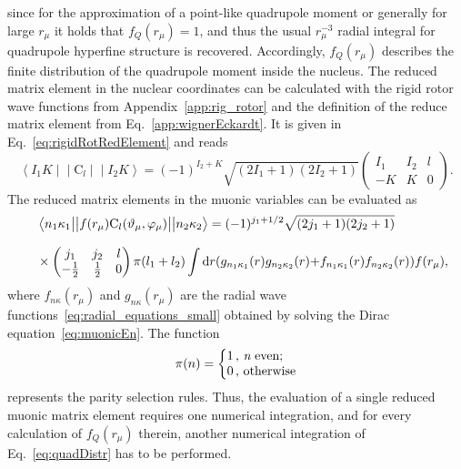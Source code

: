 since for the approximation of a point-like quadrupole moment or generally for large $r_\mu$ it holds that $f_Q(r_\mu)=1$, and thus the usual $r_\mu^{-3}$ radial integral for quadrupole hyperfine structure is recovered. Accordingly, $f_Q(r_\mu)$ describes the finite distribution of the quadrupole moment inside the nucleus. The reduced matrix element in the nuclear coordinates can be calculated with the rigid rotor wave functions from Appendix~\ref{app:rig_rotor} and the definition of the reduce matrix element from Eq.~\eqref{app:wignerEckardt}. It is given in Eq.~\eqref{eq:rigidRotRedElement} and reads
\begin{equation}
\left< I_1K\middle|\middle|\text{C}_l\middle|\middle|I_2K\right>=(-1)^{I_2+K}
\sqrt{(2I_1+1)(2I_2+1)}
\left(
\begin{matrix}
I_1&I_2&l\\
-K&K&0
\end{matrix}
\right).
\end{equation}
The reduced matrix elements in the muonic variables can be evaluated as~\cite{johnson2007}
\begin{alignat}{2}
&&&\left< n_1\kappa_1\big{|}\big{|}f(r_\mu)\text{C}_l(\vartheta_\mu,\varphi_\mu) \big{|}\big{|}n_2\kappa_2\right> =
 (-1)^{j_1+1/2} \sqrt{(2j_1+1)(2j_2+1)}
\notag\\[7.5pt]
&&&\times
\left(
\begin{matrix}
j_1&j_2&l\\
-\frac{1}{2}&\frac{1}{2}&0
\end{matrix}
\right)\pi(l_1+l_2)\int \text{d}r ({g_{n_1\kappa_1}(r)g_{n_2\kappa_2}(r)}{+}{f_{n_1\kappa_1}(r)f_{n_2\kappa_2}(r)}) f(r_\mu),
\end{alignat}
where $f_{n\kappa}(r_\mu)$ and $g_{n\kappa}(r_\mu)$ are the radial wave functions~\eqref{eq:radial_equations_small} obtained by solving the Dirac equation~\eqref{eq:muonicEn}.
The function
\begin{equation}
\label{eq:parityFunc}
\pi(n) =
\left\{
\begin{matrix}
1\,\text{, {\it n} even;}\phantom{11}\\
0\,\text{, otherwise}
\end{matrix}
\right.
\end{equation}
represents the parity selection rules.
Thus, the evaluation of a single reduced muonic matrix element requires one numerical integration, and for every calculation of $f_Q(r_\mu)$ therein, another numerical integration of Eq.~\eqref{eq:quadDistr} has to be performed.

